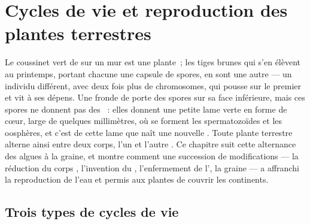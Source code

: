 \chapter{Cycles de vie et reproduction des plantes terrestres}\label{ch:b2:plant-life-cycles}

Le coussinet vert de  sur un mur est une plante~; les tiges brunes
qui s'en élèvent au printemps, portant chacune une capsule de spores,
en sont une autre --- un individu différent, avec deux fois plus de
chromosomes, qui pousse sur le premier et vit à ses dépens. Une fronde
de  porte des spores sur sa face inférieure, mais ces spores ne
donnent pas des ~: elles donnent une petite lame verte en forme
de cœur, large de quelques millimètres, où se forment les
spermatozoïdes et les oosphères, et c'est de cette lame que naît une
nouvelle . Toute plante terrestre alterne ainsi entre deux
corps, l'un  et l'autre . Ce chapitre suit cette
alternance des algues à la graine, et montre comment une succession de
modifications --- la réduction du corps , l'invention du ,
l'enfermement de l', la graine --- a affranchi la reproduction de
l'eau et permis aux plantes de couvrir les continents.

\section{Trois types de cycles de vie}

